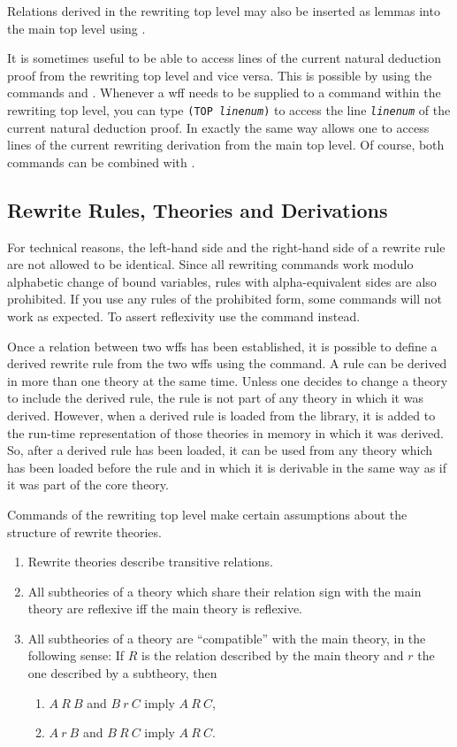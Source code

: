 Relations derived in the rewriting top level may also be inserted as lemmas
into the main top level using .

It is sometimes useful to be able to access lines of the current natural
deduction proof from the rewriting top level and vice versa. This is possible
by using the commands  and . Whenever a
wff needs to be supplied to a command within the rewriting top level, you can
type \texttt{(TOP \textit{linenum})} to access the line
\texttt{\textit{linenum}} of the
current natural deduction proof. In exactly the same way 
allows one to access lines of the current rewriting derivation from the main
top level. Of course, both commands can be combined with .

\subsection{Rewrite Rules, Theories and Derivations}

For technical reasons, the left-hand side and the right-hand side of a rewrite
rule are not allowed to be identical. Since all rewriting commands work modulo
alphabetic change of bound variables, rules with alpha-equivalent sides are
also prohibited. If you use any rules of the prohibited form, some commands
will not work as expected. To assert reflexivity use the command
 instead.

Once a relation between two wffs has been established, it is possible to
define a derived rewrite rule from the two wffs using the
 command. A rule can be derived in more than one
theory at the same time. Unless one decides to change a theory to include the
derived rule, the rule is not part of any theory in which it was derived.
However, when a derived rule is loaded from the library, it is added to the
run-time representation of those theories in memory in which it was derived.
So, after a derived rule has been loaded, it can be used from any theory which
has been loaded before the rule and in which it is derivable in the same way as
if it was part of the core theory.

Commands of the rewriting top level make certain assumptions about the
structure of rewrite theories.
\begin{enumerate}
\item Rewrite theories describe transitive relations.
\item All subtheories of a theory which share their relation sign with the main
  theory are reflexive iff the main theory is reflexive.
\item All subtheories of a theory are ``compatible'' with the main theory, in
  the following sense: If $R$ is the relation described by the main theory
  and $r$ the one described by a subtheory, then
  \begin{enumerate}
  \item $A~R~B$ and $B~r~C$ imply $A~R~C$,
  \item $A~r~B$ and $B~R~C$ imply $A~R~C$.
  \end{enumerate}
\end{enumerate}

